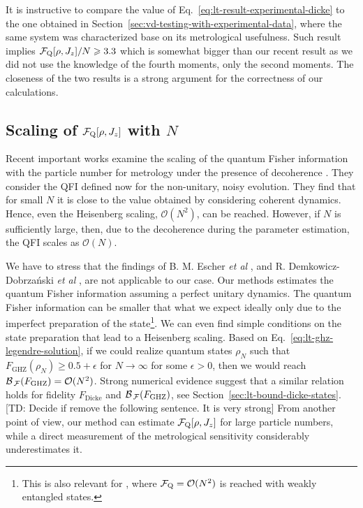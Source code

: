 It is instructive to compare the value of Eq.~\eqref{eq:lt-result-experimental-dicke} to the one obtained in Section~\ref{sec:vd-testing-with-experimental-data}, where the same system was characterized base on its metrological usefulness.
Such result implies $\mathcal{F}_{\textnormal{Q}}[{\textstyle \rho,J_z}]/N\geqslant3.3$ which is somewhat bigger than our recent result as we did not use the knowledge of the fourth moments, only the second moments.
The closeness of the two results is a strong argument for the correctness of our calculations.

\subsection{Scaling of $\mathcal{F}_{\textnormal{Q}}[{\textstyle \rho,J_z}]$ with $N$}

Recent important works examine the scaling of the quantum Fisher information with the particle number for metrology under the presence of decoherence \cite{Escher2011, Demkowicz-Dobrzanski2012}.
They consider the QFI defined now for the non-unitary, noisy evolution.
They find that for small $N$ it is close to the value obtained by considering coherent dynamics.
Hence, even the Heisenberg scaling, $\mathcal{O}(N^2)$, can be reached.
However, if $N$ is sufficiently large, then, due to the decoherence during the parameter estimation, the QFI scales as $\mathcal{O}(N)$.

We have to stress that the findings of B. M. Escher {\it et al} \cite{Escher2011}, and R. Demkowicz-Dobrza{\'{n}}ski {\it et al} \cite{Demkowicz-Dobrzanski2012}, are not applicable to our case.
Our methods estimates the quantum Fisher information assuming a perfect unitary dynamics.
The quantum Fisher information can be smaller that what we expect ideally only due to the imperfect preparation of the state\footnote{
This is also relevant for \cite{Augusiak2016}, where $\mathcal{F}_{\textnormal{Q}}=\mathcal{O}(N^2)$ is reached with weakly entangled states.}.
We can even find simple conditions on the state preparation that lead to a Heisenberg scaling.
Based on Eq.~\eqref{eq:lt-ghz-legendre-solution}, if we could realize quantum states $\rho_N$ such that $F_{\text{GHZ}}(\rho_N)\geqslant0.5+\epsilon$ for $N\rightarrow\infty$ for some $\epsilon>0$, then we would reach $\mathcal{B}_{\, \mathcal{F} }(F_{\text{GHZ}}) = \mathcal{O}(N^2)$.
Strong numerical evidence suggest that a similar relation holds for fidelity $F_{\text{Dicke}}$ and $\mathcal{B}_{\, \mathcal{F} }(F_{\text{GHZ}})$, see Section~\ref{sec:lt-bound-dicke-states}.
[TD: Decide if remove the following sentence. It is very strong]
From another point of view, our method can estimate $\mathcal{F}_{\textnormal{Q}}[{\textstyle \rho,J_z}]$ for large particle numbers, while a direct measurement of the metrological sensitivity considerably underestimates it.
